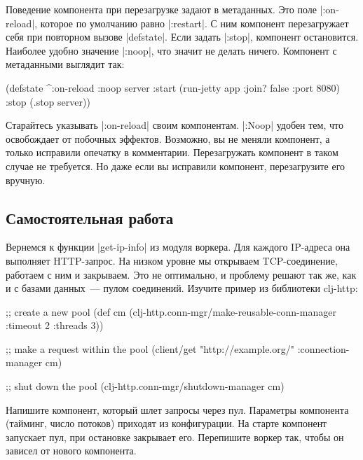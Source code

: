 Поведение компонента при перезагрузке задают в метаданных. Это поле
\spverb|:on-reload|, которое по умолчанию равно \spverb|:restart|. С ним
компонент перезагружает себя при повторном вызове \spverb|defstate|. Если задать
\spverb|:stop|, компонент остановится. Наиболее удобно значение \spverb|:noop|,
что значит не делать ничего. Компонент с метаданными выглядит так:

\begin{english}
  \begin{clojure}
(defstate ^{:on-reload :noop} server
  :start (run-jetty app {:join? false :port 8080})
  :stop (.stop server))
  \end{clojure}
\end{english}

Старайтесь указывать \spverb|:on-reload| своим компонентам. \spverb|:Noop|
удобен тем, что освобождает от побочных эффектов. Возможно, вы не меняли
компонент, а только исправили опечатку в комментарии. Перезагружать компонент в
таком случае не требуется. Но даже если вы исправили компонент, перезагрузите
его вручную.

\subsection{Самостоятельная работа}

Вернемся к функции \spverb|get-ip-info| из модуля воркера. Для каждого IP-адреса
она выполняет HTTP-запрос. На низком уровне мы открываем TCP-соединение,
работаем с ним и закрываем. Это не оптимально, и проблему решают так же, как и с
базами данных~--- пулом соединений. Изучите пример из библиотеки
clj-http:

\begin{english}
  \begin{clojure}
;; create a new pool
(def cm (clj-http.conn-mgr/make-reusable-conn-manager
         {:timeout 2 :threads 3}))

;; make a request within the pool
(client/get "http://example.org/"
            {:connection-manager cm})

;; shut down the pool
(clj-http.conn-mgr/shutdown-manager cm)
  \end{clojure}
\end{english}

Напишите компонент, который шлет запросы через пул. Параметры компонента
(тайминг, число потоков) приходят из конфигурации. На старте компонент запускает
пул, при остановке закрывает его. Перепишите воркер так, чтобы он зависел от
нового компонента.


